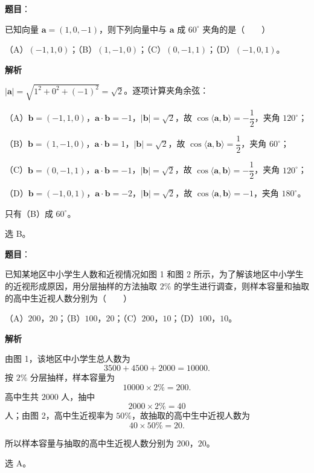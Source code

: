 \begin{answer}

\textbf{题目}：

已知向量 $\boldsymbol a=(1,0,-1)$，则下列向量中与 $\boldsymbol a$ 成 $60^\circ$ 夹角的是\mbox{（　　）}

（A）$(-1,1,0)$；（B）$(1,-1,0)$；（C）$(0,-1,1)$；（D）$(-1,0,1)$。

\textbf{解析}

$|\boldsymbol a|=\sqrt{1^2+0^2+(-1)^2}=\sqrt2$。逐项计算夹角余弦：

（A）$\boldsymbol b=(-1,1,0)$，$\boldsymbol a\cdot\boldsymbol b=-1$，$|\boldsymbol b|=\sqrt2$，故 $\cos\langle\boldsymbol a,\boldsymbol b\rangle=-\dfrac12$，夹角 $120^\circ$；

（B）$\boldsymbol b=(1,-1,0)$，$\boldsymbol a\cdot\boldsymbol b=1$，$|\boldsymbol b|=\sqrt2$，故 $\cos\langle\boldsymbol a,\boldsymbol b\rangle=\dfrac12$，夹角 $60^\circ$；

（C）$\boldsymbol b=(0,-1,1)$，$\boldsymbol a\cdot\boldsymbol b=-1$，$|\boldsymbol b|=\sqrt2$，故 $\cos\langle\boldsymbol a,\boldsymbol b\rangle=-\dfrac12$，夹角 $120^\circ$；

（D）$\boldsymbol b=(-1,0,1)$，$\boldsymbol a\cdot\boldsymbol b=-2$，$|\boldsymbol b|=\sqrt2$，故 $\cos\langle\boldsymbol a,\boldsymbol b\rangle=-1$，夹角 $180^\circ$。

只有（B）成 $60^\circ$。

选 B。


\end{answer}
\begin{answer}

\textbf{题目}：

已知某地区中小学生人数和近视情况如图 1 和图 2 所示，为了解该地区中小学生的近视形成原因，用分层抽样的方法抽取 $2\%$ 的学生进行调查，则样本容量和抽取的高中生近视人数分别为\mbox{（　　）}

（A）$200$，$20$；（B）$100$，$20$；（C）$200$，$10$；（D）$100$，$10$。
\nopagebreak[4]
\begin{center}\end{center}
\nopagebreak[4]
\textbf{解析}

由图 1，该地区中小学生总人数为
\nopagebreak[4]
\[3500+4500+2000=10000.\]
按 $2\%$ 分层抽样，样本容量为
\nopagebreak[4]
\[10000\times 2\%=200.\]
高中生共 $2000$ 人，抽中
\nopagebreak[4]
\[2000\times 2\%=40\]
人；由图 2，高中生近视率为 $50\%$，故抽取的高中生中近视人数为
\nopagebreak[4]
\[40\times 50\%=20.\]

所以样本容量与抽取的高中生近视人数分别为 $200$，$20$。

选 A。


\end{answer}
